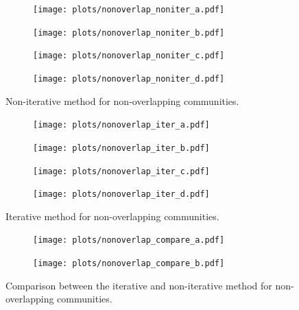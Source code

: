\begin{figure}[h!]
    \centering
    \begin{subfigure}{0.4\textwidth}
    \centering
    \texttt{[image: plots/nonoverlap\_noniter\_a.pdf]}
    \end{subfigure}%
    \begin{subfigure}{0.4\textwidth}
    \centering
    \texttt{[image: plots/nonoverlap\_noniter\_b.pdf]}
    \end{subfigure}
    \begin{subfigure}{0.4\textwidth}
    \centering
    \texttt{[image: plots/nonoverlap\_noniter\_c.pdf]}
    \end{subfigure}%
    \begin{subfigure}{0.4\textwidth}
    \centering
    \texttt{[image: plots/nonoverlap\_noniter\_d.pdf]}
    \end{subfigure}
    \caption{Non-iterative method for non-overlapping communities.}\label{fig:no_iter_no_overlap}
\end{figure}
%
\begin{figure}[h!]
    \centering
    \begin{subfigure}{0.4\textwidth}
    \centering
    \texttt{[image: plots/nonoverlap\_iter\_a.pdf]}
    \end{subfigure}%
    \begin{subfigure}{0.4\textwidth}
    \centering
    \texttt{[image: plots/nonoverlap\_iter\_b.pdf]}
    \end{subfigure}
    \begin{subfigure}{0.4\textwidth}
    \centering
    \texttt{[image: plots/nonoverlap\_iter\_c.pdf]}
    \end{subfigure}%
    \begin{subfigure}{0.4\textwidth}
    \centering
    \texttt{[image: plots/nonoverlap\_iter\_d.pdf]}
    \end{subfigure}
    \caption{Iterative method for non-overlapping communities.}\label{fig:iter_no_overlap}
\end{figure}
%
\begin{figure}[h]
    \centering
    \begin{subfigure}{0.4\textwidth}
    \centering
    \texttt{[image: plots/nonoverlap\_compare\_a.pdf]}
    \end{subfigure}%
    \begin{subfigure}{0.4\textwidth}
    \centering
    \texttt{[image: plots/nonoverlap\_compare\_b.pdf]}
    \end{subfigure}
    \caption{Comparison between the iterative and non-iterative method for 
		non-overlapping communities.}\label{fig:compare_iter_no_overlap}
\end{figure}
